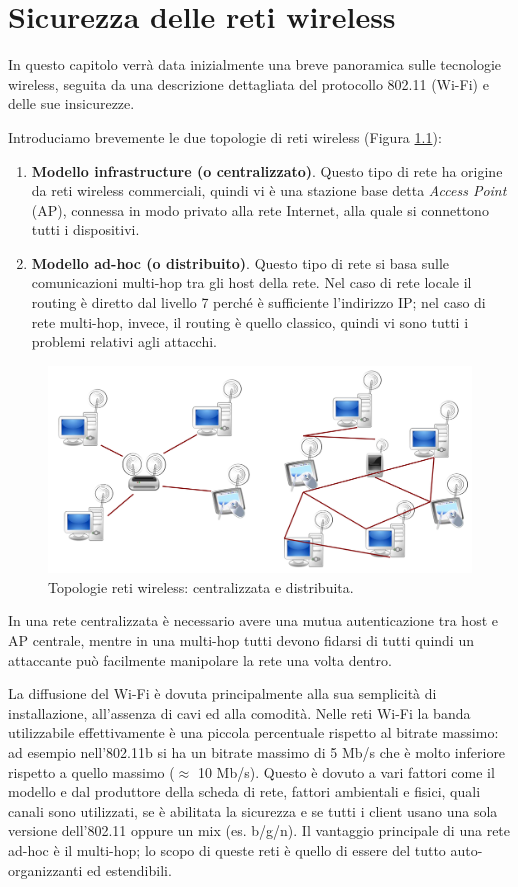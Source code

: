 \chapter{Sicurezza delle reti wireless}
In questo capitolo verrà data inizialmente una breve panoramica sulle tecnologie wireless, seguita da una descrizione dettagliata del protocollo 802.11 (Wi-Fi) e delle sue insicurezze.

Introduciamo brevemente le due topologie di reti wireless (Figura \ref{img:wireless-topology}):
\begin{enumerate}
	\item \textbf{Modello infrastructure (o centralizzato)}. Questo tipo di rete ha origine da reti wireless commerciali, quindi vi è una stazione base detta \textit{Access Point} (AP), connessa in modo privato alla rete Internet, alla quale si connettono tutti i dispositivi.
	\item \textbf{Modello ad-hoc (o distribuito)}. Questo tipo di rete si basa sulle comunicazioni multi-hop tra gli host della rete. Nel caso di rete locale il routing è diretto dal livello 7 perché è sufficiente l'indirizzo IP; nel caso di rete multi-hop, invece, il routing è quello classico, quindi vi sono tutti i problemi relativi agli attacchi.
\end{enumerate}
\begin{figure}[htbp]
	\centering
	\includegraphics[scale = 0.4]{images/wireless-topology}
	\caption{Topologie reti wireless: centralizzata e distribuita.}
	\label{img:wireless-topology}
\end{figure}
In una rete centralizzata è necessario avere una mutua autenticazione tra host e AP centrale, mentre in una multi-hop tutti devono fidarsi di tutti quindi un attaccante può facilmente manipolare la rete una volta dentro.

La diffusione del Wi-Fi è dovuta principalmente alla sua semplicità di installazione, all'assenza di cavi ed alla comodità. Nelle reti Wi-Fi la banda utilizzabile effettivamente è una piccola percentuale rispetto al bitrate massimo: ad esempio nell'802.11b si ha un bitrate massimo di 5 Mb/s che è molto inferiore rispetto a quello massimo ($\approx$ 10 Mb/s). Questo è dovuto a vari fattori come il modello e dal produttore della scheda di rete, fattori ambientali e fisici, quali canali sono utilizzati, se è abilitata la sicurezza e se tutti i client usano una sola versione dell'802.11 oppure un mix (es. b/g/n). Il vantaggio principale di una rete ad-hoc è il multi-hop; lo scopo di queste reti è quello di essere del tutto auto-organizzanti ed estendibili.

